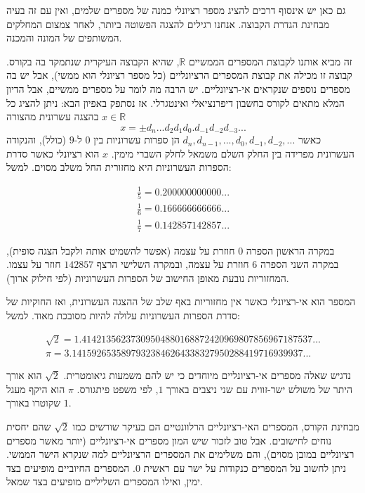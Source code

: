 \documentclass[12pt]{book}
\theoremstyle{plain}
\theoremstyle{definition}
\newcommand{\R}{\mathbb R}
\begin{document}
גם כאן יש אינסוף דרכים להציג מספר רציונלי כמנה של מספרים שלמים, ואין
עם זה בעיה מבחינת הגדרת הקבוצה. אנחנו רגילים להצגה הפשוטה ביותר, לאחר
צמצום המחלקים המשותפים של המונה והמכנה.

זה מביא אותנו לקבוצת המספרים הממשיים $\R$, שהיא הקבוצה
העיקרית שנתמקד בה בקורס. קבוצה זו מכילה את קבוצת המספרים הרציונליים (כל מספר רציונלי הוא ממשי), אבל יש בה מספרים נוספים שנקראים אי-רציונליים.
יש הרבה מה לומר על מספרים ממשיים, אבל הדיון המלא מתאים לקורס בחשבון
דיפרנציאלי ואינטגרלי. אז נסתפק באפיון הבא: ניתן להציג כל $x\in\R$
בהצגה עשרונית מהצורה
$$
x=\pm d_{n}...d_{2}d_{1}d_{0}.d_{-1}d_{-2}d_{-3}...
$$
 כאשר $d_{n},d_{n-1},...,d_{0},d_{-1},d_{-2},...$ הן ספרות עשרוניות
בין $0$ ל-$9$ (כולל), והנקודה העשרונית מפרידה בין החלק השלם
משמאל לחלק השברי מימין. $x$ הוא רציונלי כאשר סדרת הספרות העשרוניות
היא מחזורית החל משלב מסוים. למשל:

\begin{align*}
\frac{1}{5}=0.200000000000... \\
\frac{1}{6}=0.166666666666...\\
\frac{1}{7}=0.142857142857...
\end{align*}

במקרה הראשון הספרה $0$ חוזרת על עצמה (אפשר להשמיט
אותה ולקבל הצגה סופית), במקרה השני הספרה $6$ חוזרת על עצמה, ובמקרה
השלישי הרצף $142857$ חוזר על עצמו. המחזוריות נובעת מאופן החישוב
של הספרות העשרוניות (לפי חילוק ארוך).

המספר הוא אי-רציונלי כאשר אין מחזוריות באף שלב של ההצגה העשרונית,
ואז החוקיות של סדרת הספרות העשרוניות עלולה להיות מסובכת מאוד. למשל:

\begin{align*}
\sqrt{2}=1.41421356237309504880168872420969807856967187537...\\
\pi=3.14159265358979323846264338327950288419716939937...
\end{align*}

נדגיש שאלה מספרים אי-רציונליים מיוחדים כי יש להם משמעות גיאומטרית.
$\sqrt{2}$ הוא אורך היתר של משולש ישר-זווית עם שני ניצבים באורך
$1$, לפי משפט פיתגורס. $\pi$ הוא היקף מעגל שקוטרו באורך
$1$. 

מבחינת הקורס, המספרים האי-רציונליים הרלוונטיים הם בעיקר שורשים כמו
$\sqrt{2}$ שהם יחסית נוחים לחישובים. אבל טוב לזכור שיש המון מספרים
אי-רציונליים (יותר מאשר מספרים רציונליים במובן מסוים), והם משלימים
את המספרים הרציונליים למה שנקרא הישר הממשי. ניתן לחשוב על המספרים
כנקודות על ישר עם ראשית $0$. המספרים החיוביים מופיעים בצד ימין,
ואילו המספרים השליליים מופיעים בצד שמאל.
\end{document}
